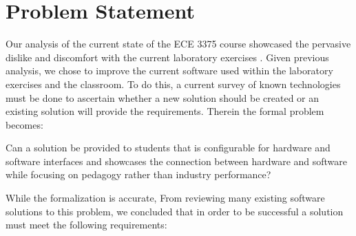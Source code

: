 \section{Problem Statement}
\label{sec:problem-statement}

Our analysis of the current state of the ECE 3375 course showcased the pervasive dislike and discomfort with the current laboratory exercises \cite{evals:ece3375-2013, evals:ece3375-2014}. Given previous analysis, we chose to improve the current software used within the laboratory exercises and the classroom. To do this, a current survey of known technologies must be done to ascertain whether a new solution should be created or an existing solution will provide the requirements. Therein the formal problem becomes: 
\begin{displayquote}
    Can a solution be provided to students that is configurable for hardware and software interfaces and showcases the connection between hardware and software while focusing on pedagogy rather than industry performance? 
\end{displayquote}
While the formalization is accurate,  From reviewing many existing software solutions to this problem, we concluded that in order to be successful a solution must meet the following requirements:

